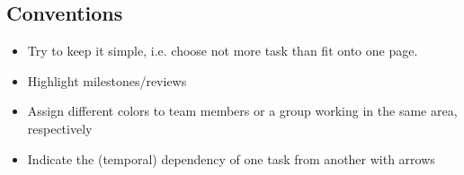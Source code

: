 \documentclass[twoside,12pt,a4paper]{article}
\begin{document}


\subsection{Conventions} %
\label{sub:conventions}

\begin{itemize}
	\item Try to keep it simple, i.e. choose not more task than fit onto one page.
	\item Highlight milestones/reviews
	\item Assign different colors to team members or a group working in the same area, respectively
	\item Indicate the (temporal) dependency of one task from another with arrows
\end{itemize}


\end{document}
